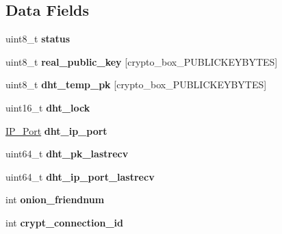 \subsection*{Data Fields}
\begin{DoxyCompactItemize}
\item 
\hypertarget{struct_friend___conn_ade818037fd6c985038ff29656089758d}{uint8\+\_\+t {\bfseries status}}\label{struct_friend___conn_ade818037fd6c985038ff29656089758d}

\item 
\hypertarget{struct_friend___conn_a996dcaefa2a5954a199e2beb584c1feb}{uint8\+\_\+t {\bfseries real\+\_\+public\+\_\+key} \mbox{[}crypto\+\_\+box\+\_\+\+P\+U\+B\+L\+I\+C\+K\+E\+Y\+B\+Y\+T\+E\+S\mbox{]}}\label{struct_friend___conn_a996dcaefa2a5954a199e2beb584c1feb}

\item 
\hypertarget{struct_friend___conn_ab863a4d1023acff25635c1b4a36015a2}{uint8\+\_\+t {\bfseries dht\+\_\+temp\+\_\+pk} \mbox{[}crypto\+\_\+box\+\_\+\+P\+U\+B\+L\+I\+C\+K\+E\+Y\+B\+Y\+T\+E\+S\mbox{]}}\label{struct_friend___conn_ab863a4d1023acff25635c1b4a36015a2}

\item 
\hypertarget{struct_friend___conn_a1da451cf7bce45009c3ae38c003f2ed8}{uint16\+\_\+t {\bfseries dht\+\_\+lock}}\label{struct_friend___conn_a1da451cf7bce45009c3ae38c003f2ed8}

\item 
\hypertarget{struct_friend___conn_ace58c2ab8adca0a754bcd2527e88a9d2}{\hyperlink{struct_i_p___port}{I\+P\+\_\+\+Port} {\bfseries dht\+\_\+ip\+\_\+port}}\label{struct_friend___conn_ace58c2ab8adca0a754bcd2527e88a9d2}

\item 
\hypertarget{struct_friend___conn_a64eb95337c42cb30956ee42f7c42cf0e}{uint64\+\_\+t {\bfseries dht\+\_\+pk\+\_\+lastrecv}}\label{struct_friend___conn_a64eb95337c42cb30956ee42f7c42cf0e}

\item 
\hypertarget{struct_friend___conn_a1b4abfeab3eeeb285cfc69b1ac8d84bb}{uint64\+\_\+t {\bfseries dht\+\_\+ip\+\_\+port\+\_\+lastrecv}}\label{struct_friend___conn_a1b4abfeab3eeeb285cfc69b1ac8d84bb}

\item 
\hypertarget{struct_friend___conn_a009e6d32e21cc7fb0c8caded782e974b}{int {\bfseries onion\+\_\+friendnum}}\label{struct_friend___conn_a009e6d32e21cc7fb0c8caded782e974b}

\item 
\hypertarget{struct_friend___conn_a5ca114d88c26607a45883173f86c7c20}{int {\bfseries crypt\+\_\+connection\+\_\+id}}\label{struct_friend___conn_a5ca114d88c26607a45883173f86c7c20}


\end{DoxyCompactItemize}
